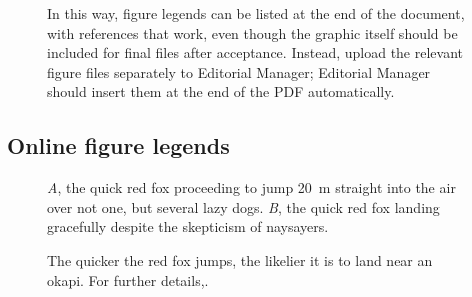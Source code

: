 \documentclass[11pt]{article}
\begin{document}
\renewcommand{\figurename}{Figure}
\setcounter{figure}{1}



\begin{figure}[h!]
\caption{In this way, figure legends can be listed at the end of the document, with references that work, even though the graphic itself should be included for final files after acceptance. Instead, upload the relevant figure files separately to Editorial Manager; Editorial Manager should insert them at the end of the PDF automatically.}
\label{Fig:AnotherFigure}
\end{figure}

\subsection*{Online figure legends}

\renewcommand{\thefigure}{A\arabic{figure}}
\setcounter{figure}{0}

\begin{figure}[h!]
\caption{\textit{A}, the quick red fox proceeding to jump 20~m straight into the air over not one, but several lazy dogs. \textit{B}, the quick red fox landing gracefully despite the skepticism of naysayers.}
\label{Fig:Jumps}
\end{figure}

\begin{figure}[h!]
\caption{The quicker the red fox jumps, the likelier it is to land near an okapi. For further details,.}
\label{Fig:JumpsOk}
\end{figure}

\renewcommand{\thefigure}{B\arabic{figure}}
\setcounter{figure}{0}
\end{document}
